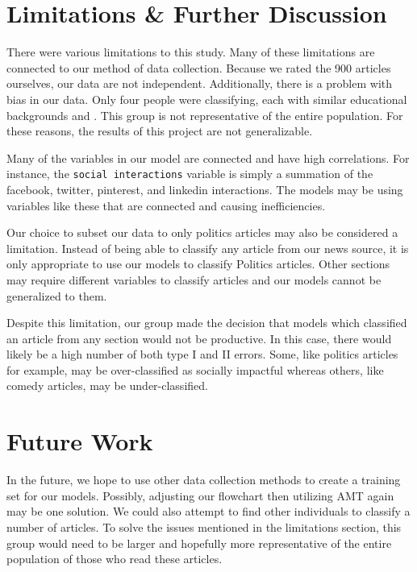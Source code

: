 \documentclass[10pt,letterpaper]{article}
\begin{document}
\section{Limitations \& Further
Discussion}\label{limitations-further-discussion}

There were various limitations to this study. Many of these limitations
are connected to our method of data collection. Because we rated the 900
articles ourselves, our data are not independent. Additionally, there is
a problem with bias in our data. Only four people were classifying, each
with similar educational backgrounds and . This group is not
representative of the entire population. For these reasons, the results
of this project are not generalizable.

Many of the variables in our model are connected and have high
correlations. For instance, the \texttt{social\ interactions} variable
is simply a summation of the facebook, twitter, pinterest, and linkedin
interactions. The models may be using variables like these that are
connected and causing inefficiencies.

Our choice to subset our data to only politics articles may also be
considered a limitation. Instead of being able to classify any article
from our news source, it is only appropriate to use our models to
classify Politics articles. Other sections may require different
variables to classify articles and our models cannot be generalized to
them.

Despite this limitation, our group made the decision that models which
classified an article from any section would not be productive. In this
case, there would likely be a high number of both type I and II errors.
Some, like politics articles for example, may be over-classified as
socially impactful whereas others, like comedy articles, may be
under-classified.

\section{Future Work}\label{future-work}

In the future, we hope to use other data collection methods to create a
training set for our models. Possibly, adjusting our flowchart then
utilizing AMT again may be one solution. We could also attempt to find
other individuals to classify a number of articles. To solve the issues
mentioned in the limitations section, this group would need to be larger
and hopefully more representative of the entire population of those who
read these articles.
\end{document}
